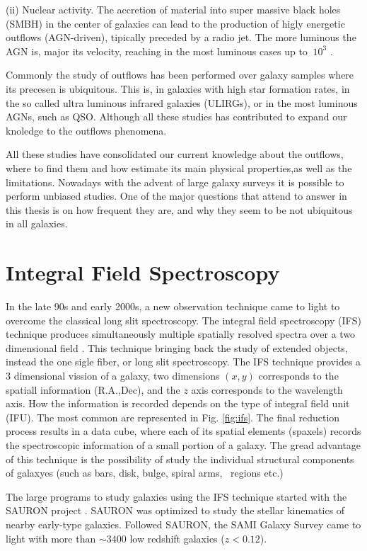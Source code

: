 (ii) Nuclear activity. The accretion of material into super massive black holes (SMBH) in the center of galaxies can lead to the production of higly energetic outflows (AGN-driven), tipically preceded
by a radio jet. The more luminous the AGN is, major its velocity, reaching in the most luminous cases up to $~10^3$ \kms. 

Commonly the study of outflows has been performed over galaxy samples where its precesen is ubiquitous. This is, in galaxies with high star formation rates, in the 
so called ultra luminous infrared galaxies (ULIRGs), or in the most luminous AGNs, such as QSO. Although all these studies has contributed to expand our knoledge to the outflows phenomena.

All these studies have consolidated our current knowledge about the outflows, where to find them and how estimate its main physical properties,as well as the
limitations. Nowadays with the advent of large galaxy surveys it is possible to perform unbiased studies. One of the major questions that attend to answer in this thesis is
on how frequent they are, and why they seem to be  not ubiquitous in all galaxies. 
 

\section{Integral Field Spectroscopy}
In the late 90s and early 2000s, a new observation technique came to light to overcome the classical long slit spectroscopy. The
integral field spectroscopy (IFS) technique produces simultaneously multiple spatially resolved spectra over a two dimensional field \cite{bookIFS}. This technique
bringing back the study of extended objects, instead the one sigle fiber, or long slit spectroscopy. The IFS technique
provides a 3 dimensional vission of a galaxy, two dimensions $(x,y)$ corresponds to the spatiall  information (R.A.,Dec), and the $z$ axis corresponds to the wavelength axis.
How the information is recorded depends on the type of integral field unit (IFU). The most common are represented in Fig. \ref{fig:ifs}. 
The final reduction process results in a data cube, where each of its spatial elements (spaxels) records the spectroscopic information of a small portion of a galaxy. The gread advantage of this
technique is the possibility of study the individual structural components of galaxyes (such as bars, disk, bulge, spiral arms, \hii~regions etc.)

The large programs to study galaxies using the IFS technique started with the SAURON project \cite{bacon01}. SAURON was optimized to study the stellar kinematics of nearby early-type galaxies.
Followed SAURON, the SAMI Galaxy Survey \cite{samiOLD} came to light with more than $\sim 3400$ low redshift galaxies ($z<0.12$). 

